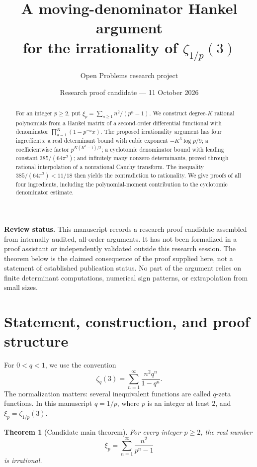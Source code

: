 \documentclass[11pt]{article}
\title{A moving-denominator Hankel argument\protect\\for the irrationality of $\zeta_{1/p}(3)$}
\author{Open Problems research project}
\date{Research proof candidate --- 11 October 2026}
\newtheorem{theorem}{Theorem}[section]
\theoremstyle{remark}
\begin{document}
\maketitle

\begin{center}
\begin{minipage}{0.94\textwidth}
\textbf{Review status.} This manuscript records a research proof candidate
assembled from internally audited, all-order arguments. It has not been
formalized in a proof assistant or independently validated outside this
research session. The theorem below is the claimed consequence of the
proof supplied here, not a statement of established publication status.
No part of the argument relies on finite determinant computations,
numerical sign patterns, or extrapolation from small sizes.
\end{minipage}
\end{center}

\begin{abstract}
For an integer $p\ge2$, put
$\xi_p=\sum_{n\ge1}n^2/(p^n-1)$.
We construct degree-$K$ rational polynomials from a Hankel matrix of a
second-order differential functional with denominator
$\prod_{a=1}^K(1-p^{-a}x)$.
The proposed irrationality argument has four ingredients: a real
determinant bound with cubic exponent $-K^3\log p/9$; a coefficientwise
factor $p^{K(K^2-1)/2}$; a cyclotomic denominator bound with leading
constant $385/(64\pi^2)$; and infinitely many nonzero determinants,
proved through rational interpolation of a nonrational Cauchy transform.
The inequality $385/(64\pi^2)<11/18$ then yields the contradiction to
rationality. We give proofs of all four ingredients, including the
polynomial-moment contribution to the cyclotomic denominator estimate.
\end{abstract}

\section{Statement, construction, and proof structure}

For $0<q<1$, we use the convention
\begin{equation}\label{eq:qzeta}
 \zeta_q(3)=\sum_{n=1}^{\infty}\frac{n^2q^n}{1-q^n}.
\end{equation}
The normalization matters: several inequivalent functions are called
$q$-zeta functions. In this manuscript $q=1/p$, where $p$ is an integer
at least $2$, and $\xi_p=\zeta_{1/p}(3)$.

\begin{theorem}[Candidate main theorem]\label{thm:main}
For every integer $p\ge2$, the real number
\[
 \xi_p=\sum_{n=1}^{\infty}\frac{n^2}{p^n-1}
\]
is irrational.
\end{theorem}
\end{document}
